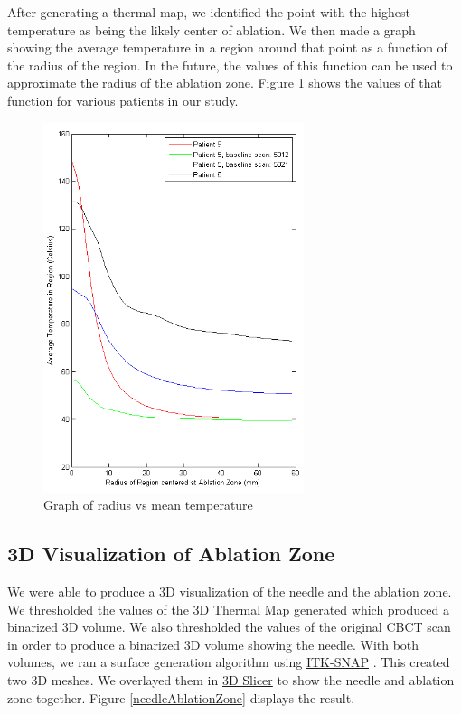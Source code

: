 \documentclass[]{spie}  %
\begin{document}
After generating a thermal map, we identified the point with the highest temperature as being the likely center of ablation. We then made a graph showing the average temperature in a region around that point as a function of the radius of the region. In the future, the values of this function can be used to approximate the radius of the ablation zone. Figure \ref{graphRadMean} shows the values of that function for various patients in our study. 

\begin{figure} 
\centering 
\includegraphics[width=3in]{meanTempVsRadiusFull.png} 
\caption{Graph of radius vs mean temperature} 
\label{graphRadMean}
\end{figure}


\subsection{3D Visualization of Ablation Zone}

We were able to produce a 3D visualization of the needle and the ablation zone. We thresholded the values of the 3D Thermal Map generated which produced a binarized 3D volume. We also thresholded the values of the original CBCT scan in order to produce a binarized 3D volume showing the needle. With both volumes, we ran a surface generation algorithm using \href{www.itksnap.org}{ITK-SNAP} \cite{Yushkevich06}. This created two 3D meshes. We overlayed them in \href{http://www.slicer.org/}{3D Slicer} \cite{Fedorov12} to show the needle and ablation zone together. Figure \ref{needleAblationZone} displays the result.
\end{document}
